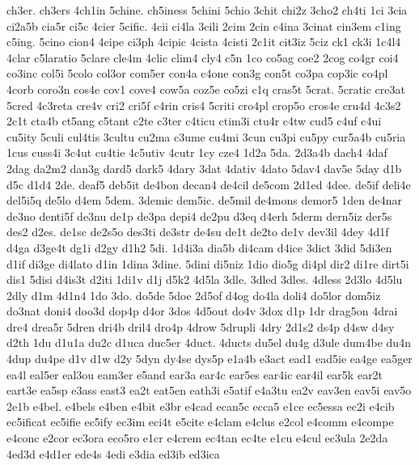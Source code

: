 {ch3er. 
ch3ers 
4ch1in 
5chine. 
ch5iness 
5chini 
5chio 
3chit 
chi2z 
3cho2 
ch4ti 
1ci 
3cia 
ci2a5b 
cia5r 
ci5c 
4cier 
5cific. 
4cii 
ci4la 
3cili 
2cim 
2cin 
c4ina 
3cinat 
cin3em 
c1ing 
c5ing. 
5cino 
cion4 
4cipe 
ci3ph 
4cipic 
4cista 
4cisti 
2c1it 
cit3iz 
5ciz 
ck1 
ck3i 
1c4l4 
4clar 
c5laratio 
5clare 
cle4m 
4clic 
clim4 
cly4 
c5n 
1co 
co5ag 
coe2 
2cog 
co4gr 
coi4 
co3inc 
col5i 
5colo 
col3or 
com5er 
con4a 
c4one 
con3g 
con5t 
co3pa 
cop3ic 
co4pl 
4corb 
coro3n 
cos4e 
cov1 
cove4 
cow5a 
coz5e 
co5zi 
c1q 
cras5t 
5crat. 
5cratic 
cre3at 
5cred 
4c3reta 
cre4v 
cri2 
cri5f 
c4rin 
cris4 
5criti 
cro4pl 
crop5o 
cros4e 
cru4d 
4c3s2 
2c1t 
cta4b 
ct5ang 
c5tant 
c2te 
c3ter 
c4ticu 
ctim3i 
ctu4r 
c4tw 
cud5 
c4uf 
c4ui 
cu5ity 
5culi 
cul4tis 
3cultu 
cu2ma 
c3ume 
cu4mi 
3cun 
cu3pi 
cu5py 
cur5a4b 
cu5ria 
1cus 
cuss4i 
3c4ut 
cu4tie 
4c5utiv 
4cutr 
1cy 
cze4 
1d2a 
5da. 
2d3a4b 
dach4 
4daf 
2dag 
da2m2 
dan3g 
dard5 
dark5 
4dary 
3dat 
4dativ 
4dato 
5dav4 
dav5e 
5day 
d1b 
d5c 
d1d4 
2de. 
deaf5 
deb5it 
de4bon 
decan4 
de4cil 
de5com 
2d1ed 
4dee. 
de5if 
deli4e 
del5i5q 
de5lo 
d4em 
5dem. 
3demic 
dem5ic. 
de5mil 
de4mons 
demor5 
1den 
de4nar 
de3no 
denti5f 
de3nu 
de1p 
de3pa 
depi4 
de2pu 
d3eq 
d4erh 
5derm 
dern5iz 
der5s 
des2 
d2es. 
de1sc 
de2s5o 
des3ti 
de3str 
de4su 
de1t 
de2to 
de1v 
dev3il 
4dey 
4d1f 
d4ga 
d3ge4t 
dg1i 
d2gy 
d1h2 
5di. 
1d4i3a 
dia5b 
di4cam 
d4ice 
3dict 
3did 
5di3en 
d1if 
di3ge 
di4lato 
d1in 
1dina 
3dine. 
5dini 
di5niz 
1dio 
dio5g 
di4pl 
dir2 
di1re 
dirt5i 
dis1 
5disi 
d4is3t 
d2iti 
1di1v 
d1j 
d5k2 
4d5la 
3dle. 
3dled 
3dles. 
4dless 
2d3lo 
4d5lu 
2dly 
d1m 
4d1n4 
1do 
3do. 
do5de 
5doe 
2d5of 
d4og 
do4la 
doli4 
do5lor 
dom5iz 
do3nat 
doni4 
doo3d 
dop4p 
d4or 
3dos 
4d5out 
do4v 
3dox 
d1p 
1dr 
drag5on 
4drai 
dre4 
drea5r 
5dren 
dri4b 
dril4 
dro4p 
4drow 
5drupli 
4dry 
2d1s2 
ds4p 
d4sw 
d4sy 
d2th 
1du 
d1u1a 
du2c 
d1uca 
duc5er 
4duct. 
4ducts 
du5el 
du4g 
d3ule 
dum4be 
du4n 
4dup 
du4pe 
d1v 
d1w 
d2y 
5dyn 
dy4se 
dys5p 
e1a4b 
e3act 
ead1 
ead5ie 
ea4ge 
ea5ger 
ea4l 
eal5er 
eal3ou 
eam3er 
e5and 
ear3a 
ear4c 
ear5es 
ear4ic 
ear4il 
ear5k 
ear2t 
eart3e 
ea5sp 
e3ass 
east3 
ea2t 
eat5en 
eath3i 
e5atif 
e4a3tu 
ea2v 
eav3en 
eav5i 
eav5o 
2e1b 
e4bel. 
e4bels 
e4ben 
e4bit 
e3br 
e4cad 
ecan5c 
ecca5 
e1ce 
ec5essa 
ec2i 
e4cib 
ec5ificat 
ec5ifie 
ec5ify 
ec3im 
eci4t 
e5cite 
e4clam 
e4clus 
e2col 
e4comm 
e4compe 
e4conc 
e2cor 
ec3ora 
eco5ro 
e1cr 
e4crem 
ec4tan 
ec4te 
e1cu 
e4cul 
ec3ula 
2e2da 
4ed3d 
e4d1er 
ede4s 
4edi 
e3dia 
ed3ib 
ed3ica 
}
